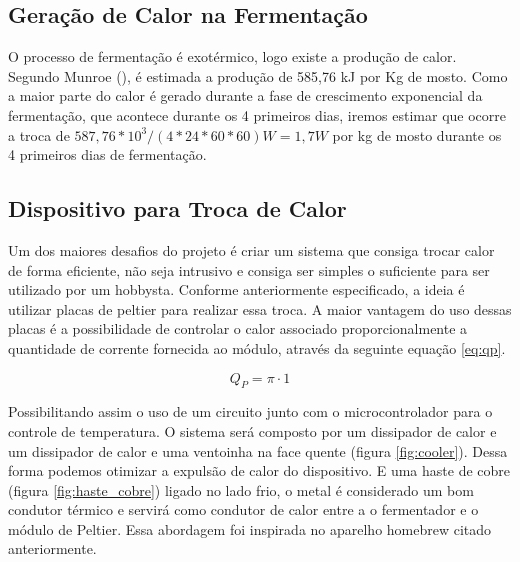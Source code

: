 \subsection{Geração de Calor na Fermentação}

O processo de fermentação é exotérmico, logo existe a produção de calor. Segundo Munroe (), é estimada a produção de 585,76 kJ por Kg de mosto. Como a maior parte do calor é gerado durante a fase de crescimento exponencial da fermentação, que acontece durante os 4 primeiros dias, iremos estimar que ocorre a troca de \(587,76 * 10^3 / (4*24*60*60)W = 1,7 W\) por kg de mosto durante os 4 primeiros dias de fermentação.   

\subsection{Dispositivo para Troca de Calor}

Um dos maiores desafios do projeto é criar um sistema que consiga trocar calor de forma eficiente, não seja intrusivo e consiga ser simples o suficiente para ser utilizado por um hobbysta. Conforme anteriormente especificado, a ideia é utilizar placas de peltier para realizar essa troca. A maior vantagem do uso dessas placas é a possibilidade de controlar o calor associado proporcionalmente a quantidade de corrente fornecida ao módulo, através da seguinte equação \ref{eq:qp}.

\begin{equation}
    Q_P = \pi \cdot 1
    \label{eq:qp}
\end{equation}

Possibilitando assim o uso de um circuito junto com o microcontrolador para o controle de temperatura. 
O sistema será composto por um dissipador de calor e um dissipador de calor e uma ventoinha na face quente (figura \ref{fig:cooler}). Dessa forma podemos otimizar a expulsão de calor do dispositivo. E uma haste de cobre (figura \ref{fig:haste_cobre}) ligado no lado frio, o metal é considerado um bom condutor térmico e servirá como condutor de calor entre a o fermentador e o módulo de Peltier. Essa abordagem foi inspirada no aparelho homebrew citado anteriormente. 

